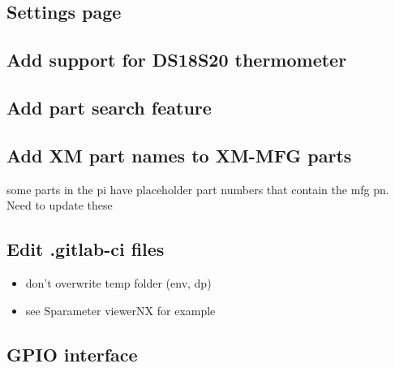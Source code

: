 \documentclass[11pt]{article}
\begin{document}
\subsection{Settings page}
\label{sec:org0f37bcf}
\subsection{Add support for DS18S20 thermometer}
\label{sec:org0d7bda5}
\subsection{Add part search feature}
\label{sec:orgeffc94c}
\subsection{Add XM part names to XM-MFG parts}
\label{sec:org31b2425}
some parts in the pi have placeholder part numbers that contain the mfg pn. Need to update these    
\subsection{Edit .gitlab-ci files}
\label{sec:org68d5327}
\begin{itemize}
\item don't overwrite temp folder (env, dp)
\item see Sparameter viewerNX for example
\end{itemize}
\subsection{GPIO interface}
\label{sec:orgb6c5023}
\end{document}
